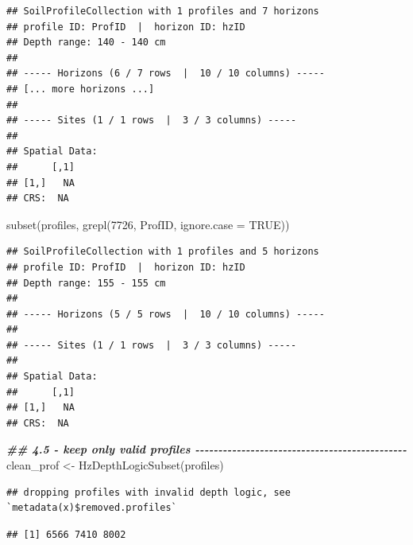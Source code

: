 \documentclass[
  10pt,
  b5paper,
  oneside]{book}
\newenvironment{Shaded}{\begin{snugshade}}{\end{snugshade}}
\newcommand{\AttributeTok}[1]{\textcolor[rgb]{0.77,0.63,0.00}{#1}}
\newcommand{\ConstantTok}[1]{\textcolor[rgb]{0.00,0.00,0.00}{#1}}
\newcommand{\DecValTok}[1]{\textcolor[rgb]{0.00,0.00,0.81}{#1}}
\newcommand{\DocumentationTok}[1]{\textcolor[rgb]{0.56,0.35,0.01}{\textbf{\textit{#1}}}}
\newcommand{\FunctionTok}[1]{\textcolor[rgb]{0.00,0.00,0.00}{#1}}
\newcommand{\NormalTok}[1]{#1}
\newcommand{\OtherTok}[1]{\textcolor[rgb]{0.56,0.35,0.01}{#1}}
\newcommand{\SpecialCharTok}[1]{\textcolor[rgb]{0.00,0.00,0.00}{#1}}
\begin{document}
\begin{verbatim}
## SoilProfileCollection with 1 profiles and 7 horizons
## profile ID: ProfID  |  horizon ID: hzID 
## Depth range: 140 - 140 cm
## 
## ----- Horizons (6 / 7 rows  |  10 / 10 columns) -----
## [... more horizons ...]
## 
## ----- Sites (1 / 1 rows  |  3 / 3 columns) -----
## 
## Spatial Data:
##      [,1]
## [1,]   NA
## CRS:  NA
\end{verbatim}

\begin{Shaded}
\begin{Highlighting}[]
\FunctionTok{subset}\NormalTok{(profiles, }\FunctionTok{grepl}\NormalTok{(}\DecValTok{7726}\NormalTok{, ProfID, }\AttributeTok{ignore.case =} \ConstantTok{TRUE}\NormalTok{))}
\end{Highlighting}
\end{Shaded}

\begin{verbatim}
## SoilProfileCollection with 1 profiles and 5 horizons
## profile ID: ProfID  |  horizon ID: hzID 
## Depth range: 155 - 155 cm
## 
## ----- Horizons (5 / 5 rows  |  10 / 10 columns) -----
## 
## ----- Sites (1 / 1 rows  |  3 / 3 columns) -----
## 
## Spatial Data:
##      [,1]
## [1,]   NA
## CRS:  NA
\end{verbatim}

\begin{Shaded}
\begin{Highlighting}[]
\DocumentationTok{\#\# 4.5 {-} keep only valid profiles {-}{-}{-}{-}{-}{-}{-}{-}{-}{-}{-}{-}{-}{-}{-}{-}{-}{-}{-}{-}{-}{-}{-}{-}{-}{-}{-}{-}{-}{-}{-}{-}{-}{-}{-}{-}{-}{-}{-}{-}{-}{-}{-}{-}{-}{-}}
\NormalTok{clean\_prof }\OtherTok{\textless{}{-}} \FunctionTok{HzDepthLogicSubset}\NormalTok{(profiles)}
\end{Highlighting}
\end{Shaded}

\begin{verbatim}
## dropping profiles with invalid depth logic, see `metadata(x)$removed.profiles`
\end{verbatim}

\begin{Shaded}
\end{Shaded}

\begin{verbatim}
## [1] 6566 7410 8002
\end{verbatim}
\end{document}
